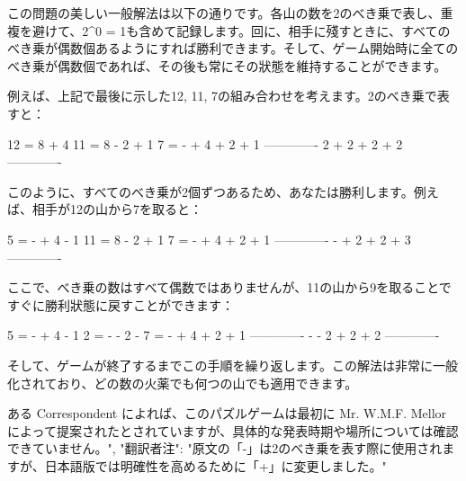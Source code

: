 \documentclass[10pt,a4paper,oneside,openany]{ltjsbook}
\begin{document}
\begin{tcolorbox}[colback=softblue,colframe=primaryblue,title=\textbf{第 396 問：A MATCH MYSTERY.},arc=2mm,boxrule=1pt,breakable]
{この問題の美しい一般解法は以下の通りです。各山の数を2のべき乗で表し、重複を避けて、2\textasciicircum{}0 = 1も含めて記録します。回に、相手に殘すときに、すべてのべき乗が偶数個あるようにすれば勝利できます。そして、ゲーム開始時に全てのべき乗が偶数個であれば、その後も常にその狀態を維持することができます。

例えば、上記で最後に示した12, 11, 7の組み合わせを考えます。2のべき乗で表すと：

    12 = 8 + 4
    11 = 8 - 2 + 1
     7 = - + 4 + 2 + 1
         -------------
         2 + 2 + 2 + 2
         -------------

このように、すべてのべき乗が2個ずつあるため、あなたは勝利します。例えば、相手が12の山から7を取ると：

     5 = - + 4 - 1
    11 = 8 - 2 + 1
     7 = - + 4 + 2 + 1
         -------------
         - + 2 + 2 + 3
         -------------

ここで、べき乗の数はすべて偶数ではありませんが、11の山から9を取ることですぐに勝利狀態に戻すことができます：

    5 = - + 4 - 1
     2 = - - 2 -
     7 = - + 4 + 2 + 1
         -------------
         - - 2 + 2 + 2
         -------------

そして、ゲームが終了するまでこの手順を繰り返します。この解法は非常に一般化されており、どの数の火薬でも何つの山でも適用できます。

ある Correspondent によれば、このパズルゲームは最初に Mr. W.M.F. Mellor によって提案されたとされていますが、具体的な発表時期や場所については確認できていません。",
  "翻訳者注": "原文の「-」は2のべき乗を表す際に使用されますが、日本語版では明確性を高めるために「+」に変更しました。"
}
\end{tcolorbox}
\end{document}

